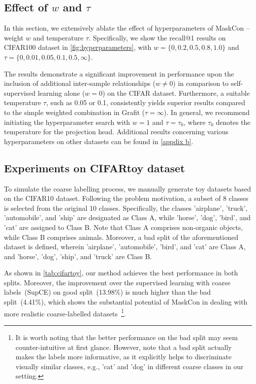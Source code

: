 \documentclass[10pt,twocolumn,letterpaper]{article}
\begin{document}
\subsection{Effect of $w$ and $\tau$}\label{exp:ablations}
In this section, we extensively ablate the effect of hyperparameters of MaskCon -- weight $w$ and temperature $\tau$. Specifically, we show the recall@1 results on CIFAR100 dataset in \cref{fig:hyperparameters}, with $w = \{0, 0.2, 0.5, 0.8, 1.0\}$ and $\tau = \{0, 0.01, 0.05, 0.1, 0.5, \infty\}$. 





The results demonstrate a significant improvement in performance upon the inclusion of additional inter-sample relationships ($w\neq 0$) in comparison to self-supervised learning alone ($w=0$) on the CIFAR dataset. Furthermore, a suitable temperature $\tau$, such as 0.05 or 0.1, consistently yields superior results compared to the simple weighted combination in Grafit ($\tau = \infty$). In general, we recommend initiating the hyperparameter search with $w = 1$ and $\tau = \tau_0$, where $\tau_0$ denotes the temperature for the projection head. Additional results concerning various hyperparameters on other datasets can be found in \cref{appdix b}.



\subsection{Experiments on CIFARtoy dataset} \label{exp:cifartoy}
To simulate the coarse labelling process, we manually generate toy datasets based on the CIFAR10 dataset. Following the problem motivation, a subset of 8 classes is selected from the original 10 classes. Specifically, the classes 'airplane', 'truck', 'automobile', and 'ship' are designated as Class A, while 'horse', 'dog', 'bird', and 'cat' are assigned to Class B. Note that Class A comprises non-organic objects, while Class B comprises animals. Moreover, a bad split of the aforementioned dataset is defined, wherein 'airplane', 'automobile', 'bird', and 'cat' are Class A, and 'horse', 'dog', 'ship', and 'truck' are Class B.


As shown in \cref{tab:cifartoy}, our method achieves the best performance in both splits. Moreover, the improvement over the supervised learning with coarse labels~(SupCE) on good split~(13.98\%) is much higher than the bad split~(4.41\%), which shows the substantial potential of MaskCon in dealing with more realistic coarse-labelled datasets~\footnote{
It is worth noting that the better performance on the bad split may seem counter-intuitive at first glance.
However, note that a bad split actually makes the labels more informative, as it explicitly helps to discriminate visually similar classes, e.g., 'cat' and 'dog' in different coarse classes in our setting.}.
\end{document}
